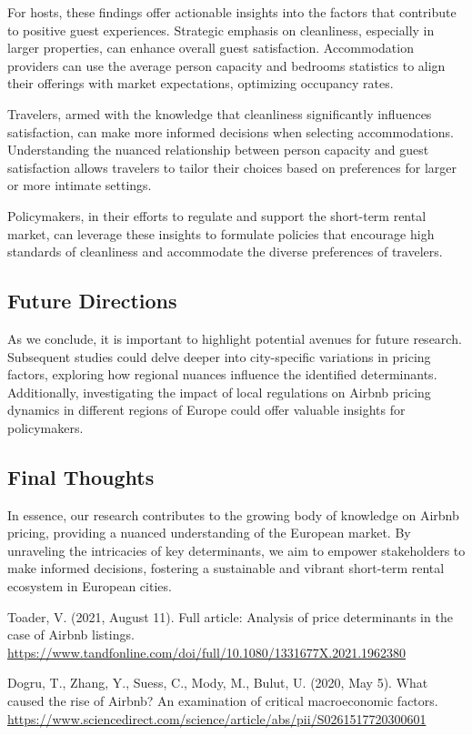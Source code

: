 \documentclass[12pt, letterpaper]{article}
\begin{document}
For hosts, these findings offer actionable insights into the factors that contribute to positive guest experiences. Strategic emphasis on cleanliness, especially in larger properties, can enhance overall guest satisfaction. Accommodation providers can use the average person capacity and bedrooms statistics to align their offerings with market expectations, optimizing occupancy rates.

Travelers, armed with the knowledge that cleanliness significantly influences satisfaction, can make more informed decisions when selecting accommodations. Understanding the nuanced relationship between person capacity and guest satisfaction allows travelers to tailor their choices based on preferences for larger or more intimate settings.

Policymakers, in their efforts to regulate and support the short-term rental market, can leverage these insights to formulate policies that encourage high standards of cleanliness and accommodate the diverse preferences of travelers.

\subsection*{Future Directions}

As we conclude, it is important to highlight potential avenues for future research. Subsequent studies could delve deeper into city-specific variations in pricing factors, exploring how regional nuances influence the identified determinants. Additionally, investigating the impact of local regulations on Airbnb pricing dynamics in different regions of Europe could offer valuable insights for policymakers.

\subsection*{Final Thoughts}

In essence, our research contributes to the growing body of knowledge on Airbnb pricing, providing a nuanced understanding of the European market. By unraveling the intricacies of key determinants, we aim to empower stakeholders to make informed decisions, fostering a sustainable and vibrant short-term rental ecosystem in European cities.

\newpage

\begin{thebibliography}{}

Toader, V. (2021, August 11). Full article: Analysis of price determinants in the case of Airbnb listings.
\url{https://www.tandfonline.com/doi/full/10.1080/1331677X.2021.1962380} 

Dogru, T., Zhang, Y., Suess, C., Mody, M., Bulut, U. (2020, May 5).
What caused the rise of Airbnb? An examination of critical macroeconomic factors.
\url{https://www.sciencedirect.com/science/article/abs/pii/S0261517720300601} 

\end{thebibliography}
\end{document}
